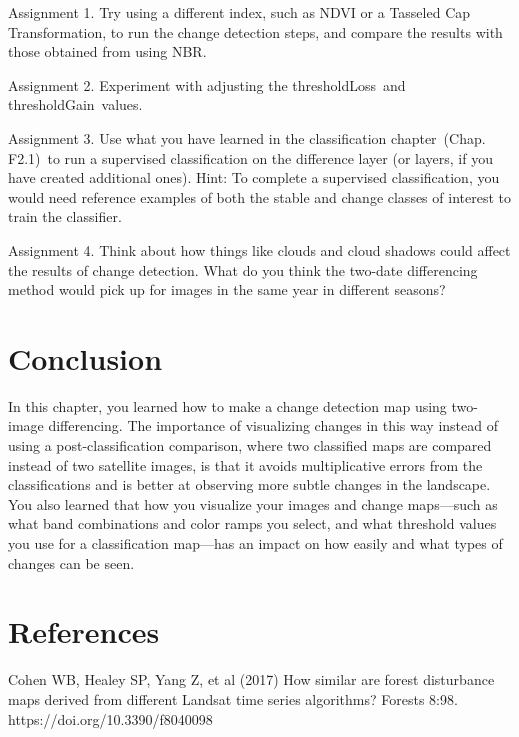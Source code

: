 \documentclass[
  letterpaper,
  DIV=11,
  numbers=noendperiod]{scrreprt}
\begin{document}
Assignment 1. Try using a different index, such as NDVI or a Tasseled
Cap Transformation, to run the change detection steps, and compare the
results with those obtained from using NBR.

Assignment 2. Experiment with adjusting the thresholdLoss~and
thresholdGain~values.

Assignment 3. Use what you have learned in the classification
chapter~(Chap. F2.1)~to run a supervised classification on the
difference layer (or layers, if you have created additional ones). Hint:
To complete a supervised classification, you would need reference
examples of both the stable and change classes of interest to train the
classifier.

Assignment 4. Think about how things like clouds and cloud shadows could
affect the results of change detection. What do you think the two-date
differencing method would pick up for images in the same year in
different seasons?

\hypertarget{conclusion-11}{%
\section*{Conclusion}\label{conclusion-11}}


In this chapter, you learned how to make a change detection map using
two-image differencing. The importance of visualizing changes in this
way instead of using a post-classification comparison, where two
classified maps are compared instead of two satellite images, is that it
avoids multiplicative errors from the classifications and is better at
observing more subtle changes in the landscape. You also learned that
how you visualize your images and change maps---such as what band
combinations and color ramps you select, and what threshold values you
use for a classification map---has an impact on how easily and what
types of changes can be seen.

\hypertarget{references-7}{%
\section*{References}\label{references-7}}


Cohen WB, Healey SP, Yang Z, et al (2017) How similar are forest
disturbance maps derived from different Landsat time series algorithms?
Forests 8:98. https://doi.org/10.3390/f8040098
\end{document}
